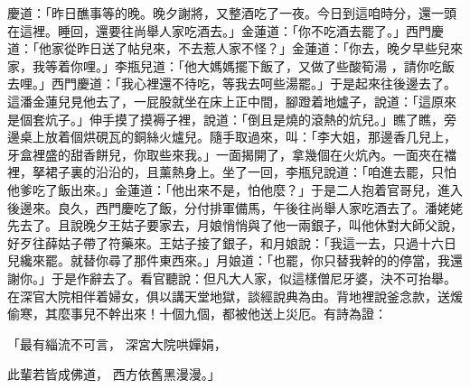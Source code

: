 \begin{showcontents}{}
慶道：「昨日醮事等的晚。晚夕謝將，又整酒吃了一夜。今日到這咱時分，還一頭在這裡。睡回，還要往尚舉人家吃酒去。」金蓮道：「你不吃酒去罷了。」西門慶道：「他家從昨日送了帖兒來，不去惹人家不怪？」金蓮道：「你去，晚夕早些兒來家，我等着你哩。」李瓶兒道：「他大媽媽擺下飯了，又做了些酸筍湯 ，請你吃飯去哩。」西門慶道：「我心裡還不待吃，等我去呵些湯罷。」于是起來往後邊去了。這潘金蓮兒見他去了，一屁股就坐在床上正中間，腳蹬着地爐子，說道：「這原來是個套炕子。」伸手摸了摸褥子裡，說道：「倒且是燒的滾熱的炕兒。」瞧了瞧，旁邊桌上放着個烘硯瓦的銅絲火爐兒。隨手取過來，叫：「李大姐，那邊香几兒上，牙盒裡盛的甜香餅兒，你取些來我。」一面揭開了，拿幾個在火炕內。一面夾在襠裡，拏裙子裏的沿沿的，且薰熱身上。坐了一回，李瓶兒說道：「咱進去罷，只怕他爹吃了飯出來。」金蓮道：「他出來不是，怕他麼？」于是二人抱着官哥兒，進入後邊來。良久，西門慶吃了飯，分付排軍備馬，午後往尚舉人家吃酒去了。潘姥姥先去了。且說晚夕王姑子要家去，月娘悄悄與了他一兩銀子，叫他休對大師父說，好歹往薛姑子帶了符藥來。王姑子接了銀子，和月娘說：「我這一去，只過十六日兒纔來罷。就替你尋了那件東西來。」月娘道：「也罷，你只替我幹的的停當，我還謝你。」于是作辭去了。看官聽說：但凡大人家，似這樣僧尼牙婆，決不可抬舉。在深官大院相伴着婦女，俱以講天堂地獄，談經說典為由。背地裡說釜念款，送煖偷寒，其麼事兒不幹出來！十個九個，都被他送上災厄。有詩為證：

「最有緇流不可言，  深宮大院哄嬋娟，

此輩若皆成佛道，  西方依舊黑漫漫。」


\end{showcontents}
